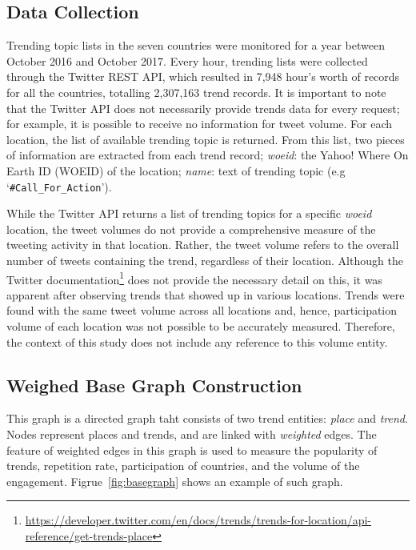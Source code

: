 \documentclass[conference]{IEEEtran}
\begin{document}
\subsection{Data Collection}

Trending topic lists in the seven countries were monitored for a year
between October 2016 and October 2017. Every hour, trending lists were
collected through the Twitter REST API, which resulted in 7,948 hour's
worth of records for all the countries, totalling 2,307,163 trend
records. It is important to note that the Twitter API does not
necessarily provide trends data for every request; for example, it is
possible to receive no information for tweet volume. For each
location, the list of available trending topic is returned. From this
list, two pieces of information are extracted from each trend record;
{\emph{woeid}}: the Yahoo! Where On Earth ID (WOEID) of the location;
{\emph{name}}: text of trending topic (e.g `{\texttt{\#Call\_For\_Action}}').


While the Twitter API returns a list of trending topics for a specific
{\emph{woeid}} location, the tweet volumes do not provide a
comprehensive measure of the tweeting activity in that
location. Rather, the tweet volume refers to the overall number of
tweets containing the trend, regardless of their location. Although
the Twitter
documentation\footnote{\url{https://developer.twitter.com/en/docs/trends/trends-for-location/api-reference/get-trends-place}}
does not provide the necessary detail on this, it was apparent after
observing trends that showed up in various locations. Trends were
found with the same tweet volume across all locations and, hence,
participation volume of each location was not possible to be
accurately measured. Therefore, the context of this study does not
include any reference to this volume entity.

\subsection{Weighed Base Graph Construction}

This graph is a directed graph taht consists of two trend entities:
{\emph{place}} and {\emph{trend}}. Nodes represent places and
trends, and are linked with {\emph{weighted}} edges. The feature 
of weighted edges in this graph is used to measure the popularity 
of trends, repetition rate, participation of countries, and the volume 
of the engagement. Figrue~\ref{fig:basegraph} shows an example 
of such graph.
\end{document}
